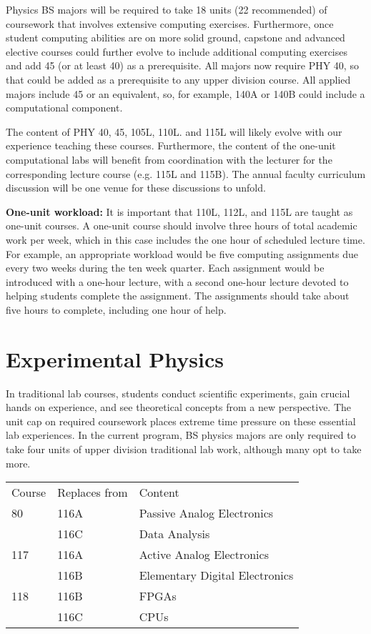 \documentclass[12pt]{article}
\begin{document}
Physics BS majors will be required to take 18 units (22 recommended)
of coursework that involves extensive computing exercises.
Furthermore, once student computing abilities are on more solid
ground, capstone and advanced elective courses could further evolve to
include additional computing exercises and add 45 (or at least 40) as
a prerequisite.  All majors now require PHY 40, so that could be added
as a prerequisite to any upper division course.  All applied majors
include 45 or an equivalent, so, for example, 140A or 140B could include
a computational component.

The content of PHY 40, 45, 105L, 110L. and 115L will likely evolve with our
experience teaching these courses.  Furthermore, the content of the
one-unit computational labs will benefit from coordination with the
lecturer for the corresponding lecture course (e.g. 115L and 115B).
The annual faculty curriculum discussion will be one venue for these
discussions to unfold.

{\bf One-unit workload: }It is important that 110L, 112L, and 115L are
taught as one-unit courses.  A one-unit course should involve three
hours of total academic work per week, which in this case includes the
one hour of scheduled lecture time.  For example, an appropriate
workload would be five computing assignments due every two weeks
during the ten week quarter.  Each assignment would be introduced with
a one-hour lecture, with a second one-hour lecture devoted to helping
students complete the assignment.  The assignments should take about
five hours to complete, including one hour of help.

\section{Experimental Physics}
\label{sec:labs}

In traditional lab courses, students conduct scientific experiments,
gain crucial hands on experience, and see theoretical concepts from a
new perspective.  The unit cap on required coursework places extreme
time pressure on these essential lab experiences. In the current
program, BS physics majors are only required to take four units of
upper division traditional lab work, although many opt to take more.

\noindent
\vskip 0.25cm
\begin{center}
\begin{tabular}{|lll|}
\hline
Course  & Replaces from & Content \\
80      & 116A        & Passive Analog Electronics \\
        & 116C        & Data Analysis \\
117     & 116A        & Active Analog Electronics \\
        & 116B        & Elementary Digital Electronics \\
118     & 116B        & FPGAs\\
        & 116C        & CPUs\\
\hline
\end{tabular}
\end{center}
\end{document}
